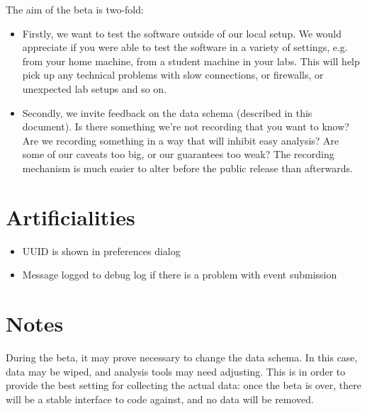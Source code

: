 \documentclass{report}
\begin{document}
The aim of the beta is two-fold:

\begin{itemize}
\item Firstly, we want to test the software outside of our local setup.  We
  would appreciate if you were able to test the software in a variety of
  settings, e.g. from your home machine, from a student machine in your labs.
  This will help pick up any technical problems with slow connections, or
  firewalls, or unexpected lab setups and so on.
\item Secondly, we invite feedback on the data schema (described in this
  document).  Is there something we're not recording that you want to know?
  Are we recording something in a way that will inhibit easy analysis?  Are
  some of our caveats too big, or our guarantees too weak?  The recording
  mechanism is much easier to alter before the public release than afterwards.
\end{itemize}

\section{Artificialities}

\begin{itemize}
\item UUID is shown in preferences dialog
\item Message logged to debug log if there is a problem with event submission
\end{itemize}

\section{Notes}

During the beta, it may prove necessary to change the data schema.  In this
case, data may be wiped, and analysis tools may need adjusting.  This is in
order to provide the best setting for collecting the actual data: once the
beta is over, there will be a stable interface to code against, and no data
will be removed.
\end{document}
